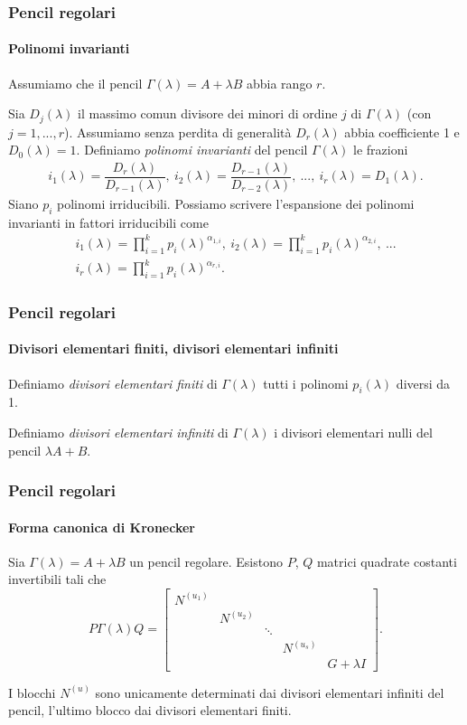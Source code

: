 \begin{frame}
	\frametitle{Pencil regolari}
	\framesubtitle{Polinomi invarianti}
	Assumiamo che il pencil $\Gamma(\lambda)=A+\lambda B$ abbia rango $r$.

	Sia \(D_{j}(\lambda)\) il massimo comun divisore dei minori di ordine $j$
	di $\Gamma(\lambda)$ (con $j=1, ..., r$). Assumiamo senza perdita di generalit\`a
	$D_r(\lambda)$ abbia coefficiente 1 e $D_0(\lambda)=1$.
	Definiamo \emph{polinomi invarianti} del
	pencil \(\Gamma(\lambda)\) le frazioni
	\begin{gather*}
		i_{1}(\lambda) = \dfrac{D_{r}(\lambda)}{D_{r-1}(\lambda)}, \
		i_{2}(\lambda) = \dfrac{D_{r-1}(\lambda)}{D_{r-2}(\lambda)}, \
		..., \
		i_{r}(\lambda) = D_{1}(\lambda).
	\end{gather*}
	\onslide<2-> Siano $p_i$ polinomi irriducibili. Possiamo scrivere l'espansione dei polinomi invarianti
	in fattori irriducibili come
	\begin{gather*}
		i_{1}(\lambda) = \prod_{i=1}^{k}p_{i}(\lambda)^{\alpha_{1, i}}, \
		i_{2}(\lambda) = \prod_{i=1}^{k}p_{i}(\lambda)^{\alpha_{2, i}}, \
		... \\
		i_{r}(\lambda) = \prod_{i=1}^{k}p_{i}(\lambda)^{\alpha_{r, i}}.
	\end{gather*}
\end{frame}


\begin{frame}
	\frametitle{Pencil regolari}
	\framesubtitle{Divisori elementari finiti, divisori elementari infiniti}
	\begin{definition}
		Definiamo \emph{divisori elementari finiti} di \(\Gamma(\lambda)\) tutti i
		polinomi $p_i(\lambda)$ diversi da 1.
	\end{definition}
	\begin{definition}[Divisori elementari infiniti]
		Definiamo
		\emph{divisori elementari infiniti} di \(\Gamma(\lambda)\) i divisori elementari nulli 
		del pencil $\lambda A + B$.
	\end{definition}
\end{frame}


\begin{frame}
	\frametitle{Pencil regolari}
	\framesubtitle{Forma canonica di Kronecker}
	\begin{theorem}
		Sia \(\Gamma(\lambda) = A+\lambda B\) un pencil regolare. Esistono $P$, $Q$ matrici
		quadrate costanti invertibili tali che
		\[
			P\Gamma(\lambda)Q=\begin{bmatrix}
			N^{(u_1)} \\
			& N^{(u_2)} \\
			&& \ddots \\
			&&& N^{(u_s)} \\
			&&&& G + \lambda I
		\end{bmatrix}.
		\]
	\end{theorem}
	\onslide<2-> I blocchi $N^{(u)}$ sono unicamente determinati dai divisori elementari infiniti
	del pencil, l'ultimo blocco dai divisori elementari finiti.
\end{frame}